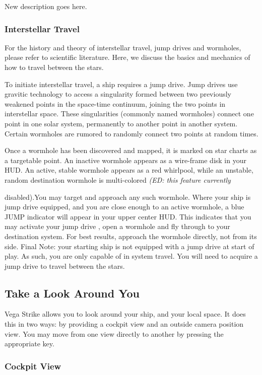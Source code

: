 \documentclass{article}
\newcommand{\key}[1]{%
  \tikz[baseline=(key.base)]{
    \node[draw=gray!50, fill=gray!5, rounded corners=2pt, inner sep=2pt, minimum height=1.5ex] (key) {\footnotesize\sffamily\bfseries #1};
  }%
}
\begin{document}
New description goes here.

\subsubsection{ Interstellar Travel }

For the history and theory of interstellar travel, jump drives and wormholes, please refer to scientific literature. Here, we discuss the basics and mechanics of how to travel between the stars. 

To initiate interstellar travel, a ship requires a jump drive. Jump drives use gravitic technology to access a singularity formed between two previously weakened points in the space-time continuum, joining the two points in interstellar space. These singularities (commonly named wormholes) connect one point in one solar system, permanently to another point in another system. Certain wormholes are rumored to randomly connect two points at random times. 

Once a wormhole has been discovered and mapped, it is marked on star charts as a targetable point. An inactive wormhole appears as a wire-frame disk in your HUD. An active, stable wormhole appears as a red whirlpool, while an unstable, random destination wormhole is multi-colored \textit{(ED: this feature currently }

disabled).You may target and approach any such wormhole. Where your ship is jump drive equipped, and you are close enough to an active wormhole, a blue JUMP indicator will appear in your upper center HUD. This indicates that you may activate your jump drive \key{j}, open a wormhole and fly through to your destination system. For best results, approach the wormhole directly, not from its side. Final Note: your starting ship is not equipped with a jump drive at start of play. As such, you are only capable of in system travel. You will need to acquire a jump drive to travel between the stars. 

\subsection{Take a Look Around You }

Vega Strike allows you to look around your ship, and your local space. It does this in two ways: by providing a cockpit view and an outside camera position view. You may move from one view directly to another by pressing the appropriate key. 

\subsubsection{ Cockpit View }
\end{document}

